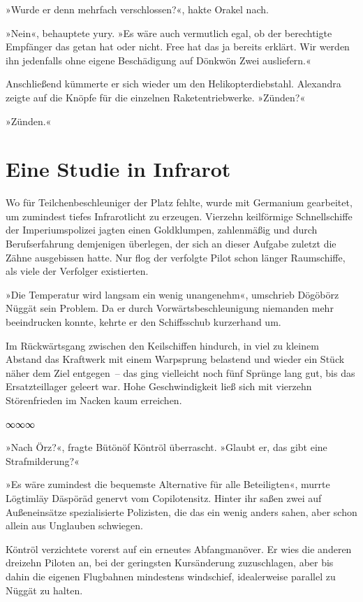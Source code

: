 »Wurde er denn mehrfach verschlossen?«, hakte Orakel nach.

»Nein«, behauptete yury. »Es wäre auch vermutlich egal, ob der berechtigte Empfänger das getan hat oder nicht. Free hat das ja bereits erklärt. Wir werden ihn jedenfalls ohne eigene Beschädigung auf Dönkwön Zwei ausliefern.«

Anschließend kümmerte er sich wieder um den Helikopterdiebstahl. Alexandra zeigte auf die Knöpfe für die einzelnen Raketentriebwerke. »Zünden?«

»Zünden.«


\chapter{Eine Studie in Infrarot}

Wo für Teilchenbeschleuniger der Platz fehlte, wurde mit Germanium gearbeitet, um zumindest tiefes Infrarotlicht zu erzeugen. Vierzehn keilförmige Schnellschiffe der Imperiumspolizei jagten einen Goldklumpen, zahlenmäßig und durch Berufserfahrung demjenigen überlegen, der sich an dieser Aufgabe zuletzt die Zähne ausgebissen hatte. Nur flog der verfolgte Pilot schon länger Raumschiffe, als viele der Verfolger existierten.

»Die Temperatur wird langsam ein wenig unangenehm«, umschrieb Dögöbörz Nüggät sein Problem. Da er durch Vorwärtsbeschleunigung niemanden mehr beeindrucken konnte, kehrte er den Schiffsschub kurzerhand um.

Im Rückwärtsgang zwischen den Keilschiffen hindurch, in viel zu kleinem Abstand das Kraftwerk mit einem Warpsprung belastend und wieder ein Stück näher dem Ziel entgegen~– das ging vielleicht noch fünf Sprünge lang gut, bis das Ersatzteillager geleert war. Hohe Geschwindigkeit ließ sich mit vierzehn Störenfrieden im Nacken kaum erreichen.

\begin{center}
∞∞∞
\end{center}

»Nach Örz?«, fragte Bütönöf Köntröl überrascht. »Glaubt er, das gibt eine Strafmilderung?«

»Es wäre zumindest die bequemste Alternative für alle Beteiligten«, murrte Lögtimläy Däspöräd genervt vom Copilotensitz. Hinter ihr saßen zwei auf Außeneinsätze spezialisierte Polizisten, die das ein wenig anders sahen, aber schon allein aus Unglauben schwiegen.

Köntröl verzichtete vorerst auf ein erneutes Abfangmanöver. Er wies die anderen dreizehn Piloten an, bei der geringsten Kursänderung zuzuschlagen, aber bis dahin die eigenen Flugbahnen mindestens windschief, idealerweise parallel zu Nüggät zu halten.

